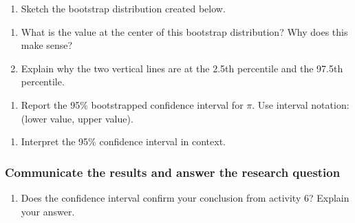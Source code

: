 \documentclass[
]{report}
\providecommand{\tightlist}{%
  \setlength{\itemsep}{0pt}\setlength{\parskip}{0pt}}
\begin{document}
\begin{enumerate}
\def\labelenumi{\arabic{enumi}.}
\setcounter{enumi}{6}
\tightlist
\item
  Sketch the bootstrap distribution created below.
\end{enumerate}

\vspace{1.8in}

\begin{enumerate}
\def\labelenumi{\arabic{enumi}.}
\setcounter{enumi}{7}
\item
  What is the value at the center of this bootstrap distribution? Why does this make sense?
  \vspace{.8in}
\item
  Explain why the two vertical lines are at the 2.5th percentile and the 97.5th percentile.
\end{enumerate}

\vspace{.8in}

\begin{enumerate}
\def\labelenumi{\arabic{enumi}.}
\setcounter{enumi}{9}
\tightlist
\item
  Report the 95\% bootstrapped confidence interval for \(\pi\). Use interval notation: (lower value, upper value).
\end{enumerate}

\vspace{0.3in}

\begin{enumerate}
\def\labelenumi{\arabic{enumi}.}
\setcounter{enumi}{10}
\tightlist
\item
  Interpret the 95\% confidence interval in context.
\end{enumerate}

\vspace{.8in}

\hypertarget{communicate-the-results-and-answer-the-research-question-1}{%
\subsubsection*{Communicate the results and answer the research question}\label{communicate-the-results-and-answer-the-research-question-1}}

\begin{enumerate}
\def\labelenumi{\arabic{enumi}.}
\setcounter{enumi}{11}
\tightlist
\item
  Does the confidence interval confirm your conclusion from activity 6? Explain your answer.
\end{enumerate}
\end{document}
